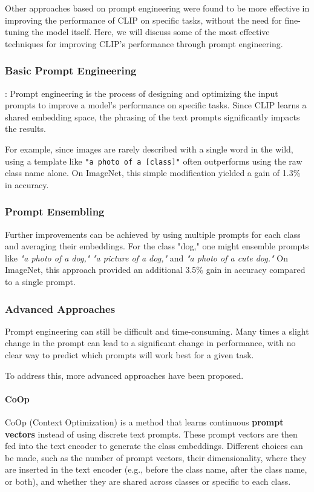 Other approaches based on prompt engineering were found to be more effective in improving the performance of CLIP on specific tasks, 
without the need for fine-tuning the model itself.
Here, we will discuss some of the most effective techniques for improving CLIP's performance through prompt engineering.

\subsubsection{Basic Prompt Engineering}:
Prompt engineering is the process of designing and optimizing the input prompts to improve a model's performance on specific tasks. 
Since CLIP learns a shared embedding space, the phrasing of the text prompts significantly impacts the results.

For example, since images are rarely described with a single word in the wild, using a template like \texttt{"a photo of a [class]"} 
often outperforms using the raw class name alone. On ImageNet, this simple modification yielded a gain of 1.3\% in accuracy.

\subsubsection{Prompt Ensembling}
Further improvements can be achieved by using multiple prompts for each class and averaging their embeddings. 
For the class "dog," one might ensemble prompts like \textit{"a photo of a dog,"} \textit{"a picture of a dog,"} and \textit{"a photo of a cute dog."} On ImageNet, 
this approach provided an additional 3.5\% gain in accuracy compared to a single prompt.

\subsubsection{Advanced Approaches}
Prompt engineering can still be difficult and time-consuming. Many times a slight change in the prompt can lead to a significant change in performance,
with no clear way to predict which prompts will work best for a given task.

To address this, more advanced approaches have been proposed.

\paragraph{CoOp}
CoOp (Context Optimization) is a method that learns continuous \textbf{prompt vectors} instead of using discrete text prompts.
These prompt vectors are then fed into the text encoder to generate the class embeddings.
Different choices can be made, such as the number of prompt vectors, their dimensionality, where they are inserted in the text encoder (e.g., before the class name, after the class name, or both), 
and whether they are shared across classes or specific to each class.

